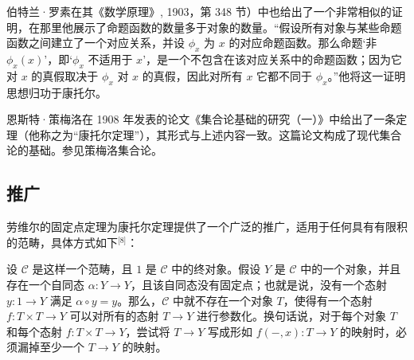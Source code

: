 伯特兰·罗素在其《数学原理》, 1903，第 348 节）中也给出了一个非常相似的证明，在那里他展示了命题函数的数量多于对象的数量。“假设所有对象与某些命题函数之间建立了一个对应关系，并设 $\phi_x$ 为 $x$ 的对应命题函数。那么命题‘非 $\phi_x(x)$’，即‘$\phi_x$ 不适用于 $x$’，是一个不包含在该对应关系中的命题函数；因为它对 $x$ 的真假取决于 $\phi_x$ 对 $x$ 的真假，因此对所有 $x$ 它都不同于 $\phi_x$。”他将这一证明思想归功于康托尔。

恩斯特·策梅洛在 1908 年发表的论文《集合论基础的研究（一）》中给出了一条定理（他称之为“康托尔定理”），其形式与上述内容一致。这篇论文构成了现代集合论的基础。参见策梅洛集合论。
\subsection{推广}
劳维尔的固定点定理为康托尔定理提供了一个广泛的推广，适用于任何具有有限积的范畴，具体方式如下\(^\text{[8]}\)：

设 $\mathcal{C}$ 是这样一个范畴，且 $1$ 是 $\mathcal{C}$ 中的终对象。假设 $Y$ 是 $\mathcal{C}$ 中的一个对象，并且存在一个自同态 $\alpha : Y \to Y$，且该自同态没有固定点；也就是说，没有一个态射 $y : 1 \to Y$ 满足 $\alpha \circ y = y$。那么，$\mathcal{C}$ 中就不存在一个对象 $T$，使得有一个态射 $f : T \times T \to Y$ 可以对所有的态射 $T \to Y$ 进行参数化。换句话说，对于每个对象 $T$ 和每个态射 $f : T \times T \to Y$，尝试将 $T \to Y$ 写成形如 $f(-,x) : T \to Y$ 的映射时，必须漏掉至少一个 $T \to Y$ 的映射。
